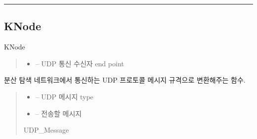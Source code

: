 \documentclass[a4paper,10pt,english]{sphinxmanual}
\begin{document}
\bigskip\hrule\bigskip



\subsection{KNode}
\label{\detokenize{_kademlia:knode}}

\begin{fulllineitems}
\label{\detokenize{_kademlia:KNode}}
\pysigstartsignatures
{}
\pysigstopsignatures
\sphinxAtStartPar
KNode
\begin{quote}\begin{description}
\begin{itemize}
\item {} 
\sphinxAtStartPar
{} – UDP 통신 수신자 end point

\end{itemize}

\end{description}\end{quote}

\begin{fulllineitems}
\label{\detokenize{_kademlia:KNode._MSG}}
\pysigstartsignatures
{}
\pysigstopsignatures
\sphinxAtStartPar
분산 탐색 네트워크에서 통신하는 UDP 프로토콜 메시지 규격으로 변환해주는 함수.
\begin{quote}\begin{description}
\begin{itemize}
\item {} 
\sphinxAtStartPar
{} – UDP 메시지 type

\item {} 
\sphinxAtStartPar
{} – 전송할 메시지

\end{itemize}

\sphinxAtStartPar
UDP\_Message


\end{description}
\end{quote}
\end{fulllineitems}
\end{fulllineitems}
\end{document}

